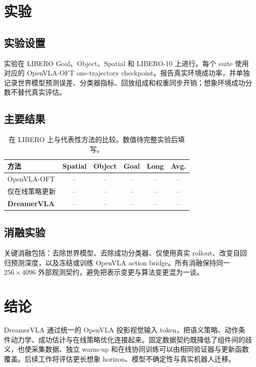 \documentclass{article}
\begin{document}
\section{实验}

\subsection{实验设置}

实验在 LIBERO Goal、Object、Spatial 和 LIBERO-10 上进行。每个 suite 使用对应的 OpenVLA-OFT one-trajectory checkpoint。报告真实环境成功率，并单独记录世界模型预测误差、分类器指标、回放组成和权重同步开销；想象环境成功分数不替代真实评估。

\subsection{主要结果}

\begin{table}[t]
\centering
\caption{在 LIBERO 上与代表性方法的比较。数值待完整实验后填写。}
\label{tab:libero_main_simple_zh}
\setlength{\tabcolsep}{6pt}
\begin{tabular}{lccccc}
\toprule
方法 & Spatial & Object & Goal & Long & Avg. \\
\midrule
OpenVLA-OFT & -- & -- & -- & -- & -- \\
仅在线策略更新 & -- & -- & -- & -- & -- \\
\textbf{DreamerVLA} & -- & -- & -- & -- & -- \\
\bottomrule
\end{tabular}
\end{table}

\subsection{消融实验}

关键消融包括：去除世界模型、去除成功分类器、仅使用真实 rollout、改变自回归预测深度，以及冻结或训练 OpenVLA action bridge。所有消融保持同一 $256\times4096$ 外部观测契约，避免把表示变更与算法变更混为一谈。

\section{结论}

DreamerVLA 通过统一的 OpenVLA 投影视觉输入 token，把语义策略、动作条件动力学、成功估计与在线策略优化连接起来。固定数据契约既降低了组件间的歧义，也使采集数据、独立 warm-up 和在线协同训练可以由相同验证器与更新函数覆盖。后续工作将评估更长想象 horizon、模型不确定性与真实机器人迁移。
\end{document}
